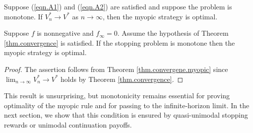 \documentclass[11pt]{article}
\begin{document}
\begin{thm}\label{thm.convergene.myopic}
	Suppose (\ref{eqn.A1}) and (\ref{eqn.A2}) are satisfied and suppose the problem is monotone. If  $V^*_n \to V^*$ as $n \to \infty$, then the myopic strategy is optimal.
\end{thm}

\begin{cor}\label{cor.monotone}
	Suppose $f$ is nonnegative and $f_\infty=0$. 
		Assume  the hypothesis of Theorem \ref{thm.convergence} is satisfied. 
	If the stopping problem is monotone then the myopic strategy is optimal. 
\end{cor}
\begin{proof}
The  assertion  follows from Theorem \ref{thm.convergene.myopic} 	since  $\lim_{n \to \infty} V^*_n \to V^*$ holds by Theorem \ref{thm.convergence}.
\end{proof}




This result is unsurprising, but monotonicity remains essential for proving optimality of the myopic rule and for passing to the infinite-horizon limit.  In the next section, we show that this condition is ensured by quasi-unimodal stopping rewards or unimodal continuation payoffs.
\end{document}
